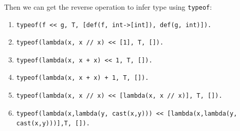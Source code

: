 \documentclass[a4paper]{exam}
\begin{document}
Then we can get the reverse operation to infer type using \texttt{typeof}:
\begin{enumerate}
  \item \begin{verbatim}
typeof(f << g, T, [def(f, int->[int]), def(g, int)]).
  \end{verbatim}

        \begin{solution}

        \end{solution}
  \item \begin{verbatim}
typeof(lambda(x, x // x) << [1], T, []).
  \end{verbatim}

        \begin{solution}

        \end{solution}
  \item \begin{verbatim}
typeof(lambda(x, x + x) << 1, T, []).
  \end{verbatim}

        \begin{solution}

        \end{solution}
  \item \begin{verbatim}
typeof(lambda(x, x + x) + 1, T, []).
  \end{verbatim}
        \begin{solution}

        \end{solution}
  \item \begin{verbatim}
typeof(lambda(x, x // x) << [lambda(x, x // x)], T, []).
  \end{verbatim}

        \begin{solution}

        \end{solution}
  \item \begin{verbatim}
typeof(lambda(x,lambda(y, cast(x,y))) << [lambda(x,lambda(y, cast(x,y)))],T, []).
  \end{verbatim}

        \begin{solution}

        \end{solution}

\end{enumerate}
\end{document}
